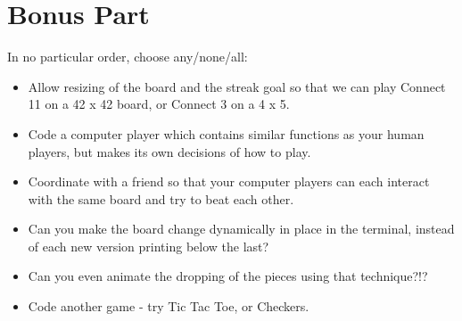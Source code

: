 \documentclass{42-en}
\begin{document}

\chapter{Bonus Part}

In no particular order, choose any/none/all:

\begin{itemize}

\item Allow resizing of the board and the streak goal so that we can play Connect 11 on a 42 x 42 board, or Connect 3 on a 4 x 5.
\item Code a computer player which contains similar functions as your human players, but makes its own decisions of how to play.
\item Coordinate with a friend so that your computer players can each interact with the same board and try to beat each other.
\item Can you make the board change dynamically in place in the terminal, instead of each new version printing below the last?
\item Can you even animate the dropping of the pieces using that technique?!?
\item Code another game - try Tic Tac Toe, or Checkers.

\end{itemize}

\end{document}
